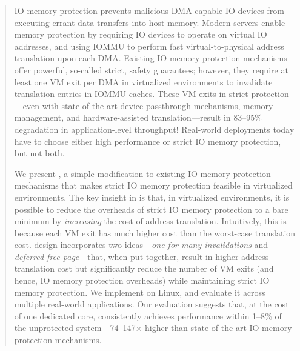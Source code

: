 \begin{abstract}
IO memory protection prevents malicious DMA-capable IO devices from executing errant data transfers 
    into host memory. 
Modern servers enable memory protection by requiring IO devices 
    to operate on virtual IO addresses, 
    and using IOMMU %
    to perform fast virtual-to-physical address translation upon each DMA. 
Existing IO memory protection mechanisms offer powerful, so-called strict, safety guarantees; 
however, they require at least one VM exit per DMA in virtualized environments 
    to invalidate translation entries in IOMMU caches. 
These VM exits in strict protection---even with state-of-the-art 
    device passthrough mechanisms, memory management, 
    and hardware-assisted translation---result in 83--95$\%$ 
    degradation in application-level throughput! 
Real-world deployments today have to choose either high performance 
    or strict IO memory protection, but not both. 

We present {\name}, a simple modification to existing IO memory protection mechanisms 
    that makes strict IO memory protection feasible in virtualized environments. 
The key insight in {\name} is that, in virtualized environments, 
    it is possible to reduce the overheads of strict IO memory protection 
    to a bare minimum by \textit{increasing} the cost of address translation. 
Intuitively, this is because each VM exit has much higher cost 
    than the worst-case translation cost. 
{\name} design incorporates two ideas---\textit{one-for-many invalidations} and \textit{deferred free page}---that, 
    when put together, result in higher address translation cost but significantly 
    reduce the number of VM exits (and hence, IO memory protection overheads) 
    while maintaining strict IO memory protection. 
We implement {\name} on Linux, and evaluate it across multiple real-world applications. 
Our evaluation suggests that, at the cost of one dedicated core, 
    {\name} consistently achieves performance within 1--8$\%$ of 
    the unprotected system---74--147$\times$ higher than state-of-the-art IO memory protection mechanisms. 



\end{abstract}
